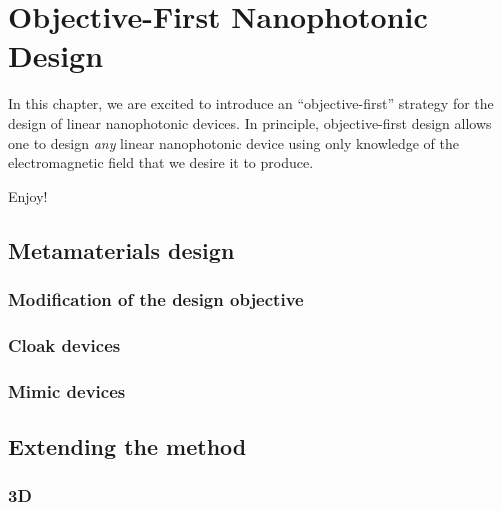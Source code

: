 \newcommand{\BE}{\begin{equation}}
\newcommand{\EE}{\end{equation}}
\newcommand{\BA}{\begin{eqnarray}}
\newcommand{\EA}{\end{eqnarray}}
\newcommand{\curl}{\nabla\times}
\newcommand{\minimize}[1]{\JLUminimize_{#1}\;&}
\newcommand{\subto}{\text{subject to}\;&}
\newcommand{\myfig}[2]{\begin{figure}[!h]\texttt{[image: fig/\#1]}\caption{#2}\label{#1}\end{figure}}

\chapter{Objective-First Nanophotonic Design}
\label{intro}


In this chapter, we are excited to introduce an ``objective-first'' strategy
    for the design of linear nanophotonic devices.
In principle, objective-first design allows one to design
    \emph{any} linear nanophotonic device 
    using only knowledge of the electromagnetic field
    that we desire it to produce.

Enjoy!







\section{Metamaterials design}
\subsection{Modification of the design objective}
\subsection{Cloak devices}
\subsection{Mimic devices}

\section{Extending the method}
\subsection{3D}
